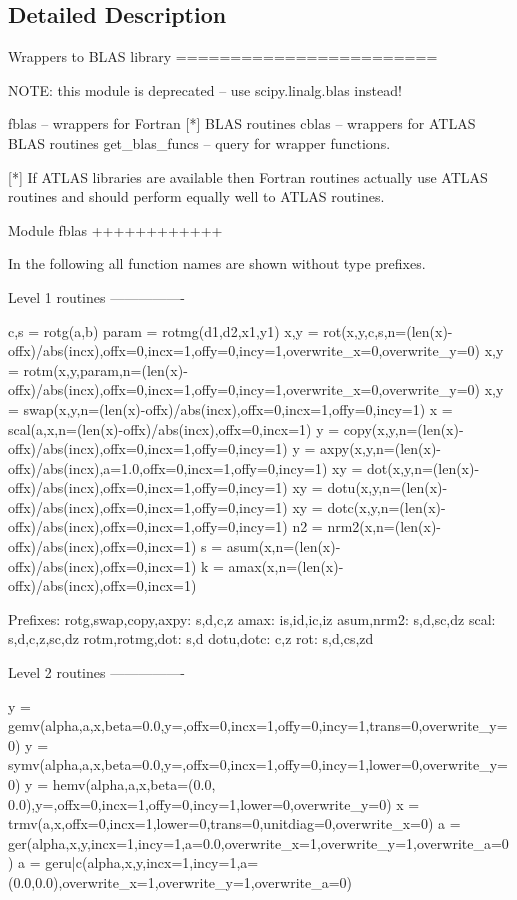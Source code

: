 \subsection{Detailed Description}
\begin{DoxyVerb}Wrappers to BLAS library
========================

NOTE: this module is deprecated -- use scipy.linalg.blas instead!

fblas -- wrappers for Fortran [*] BLAS routines
cblas -- wrappers for ATLAS BLAS routines
get_blas_funcs -- query for wrapper functions.

[*] If ATLAS libraries are available then Fortran routines
    actually use ATLAS routines and should perform equally
    well to ATLAS routines.

Module fblas
++++++++++++

In the following all function names are shown without type prefixes.

Level 1 routines
----------------

  c,s = rotg(a,b)
  param = rotmg(d1,d2,x1,y1)
  x,y = rot(x,y,c,s,n=(len(x)-offx)/abs(incx),offx=0,incx=1,offy=0,incy=1,overwrite_x=0,overwrite_y=0)
  x,y = rotm(x,y,param,n=(len(x)-offx)/abs(incx),offx=0,incx=1,offy=0,incy=1,overwrite_x=0,overwrite_y=0)
  x,y = swap(x,y,n=(len(x)-offx)/abs(incx),offx=0,incx=1,offy=0,incy=1)
  x = scal(a,x,n=(len(x)-offx)/abs(incx),offx=0,incx=1)
  y = copy(x,y,n=(len(x)-offx)/abs(incx),offx=0,incx=1,offy=0,incy=1)
  y = axpy(x,y,n=(len(x)-offx)/abs(incx),a=1.0,offx=0,incx=1,offy=0,incy=1)
  xy = dot(x,y,n=(len(x)-offx)/abs(incx),offx=0,incx=1,offy=0,incy=1)
  xy = dotu(x,y,n=(len(x)-offx)/abs(incx),offx=0,incx=1,offy=0,incy=1)
  xy = dotc(x,y,n=(len(x)-offx)/abs(incx),offx=0,incx=1,offy=0,incy=1)
  n2 = nrm2(x,n=(len(x)-offx)/abs(incx),offx=0,incx=1)
  s = asum(x,n=(len(x)-offx)/abs(incx),offx=0,incx=1)
  k = amax(x,n=(len(x)-offx)/abs(incx),offx=0,incx=1)

  Prefixes:
    rotg,swap,copy,axpy: s,d,c,z
    amax: is,id,ic,iz
    asum,nrm2: s,d,sc,dz
    scal: s,d,c,z,sc,dz
    rotm,rotmg,dot: s,d
    dotu,dotc: c,z
    rot: s,d,cs,zd

Level 2 routines
----------------

  y = gemv(alpha,a,x,beta=0.0,y=,offx=0,incx=1,offy=0,incy=1,trans=0,overwrite_y=0)
  y = symv(alpha,a,x,beta=0.0,y=,offx=0,incx=1,offy=0,incy=1,lower=0,overwrite_y=0)
  y = hemv(alpha,a,x,beta=(0.0, 0.0),y=,offx=0,incx=1,offy=0,incy=1,lower=0,overwrite_y=0)
  x = trmv(a,x,offx=0,incx=1,lower=0,trans=0,unitdiag=0,overwrite_x=0)
  a = ger(alpha,x,y,incx=1,incy=1,a=0.0,overwrite_x=1,overwrite_y=1,overwrite_a=0)
  a = ger{u|c}(alpha,x,y,incx=1,incy=1,a=(0.0,0.0),overwrite_x=1,overwrite_y=1,overwrite_a=0)


\end{DoxyVerb}

